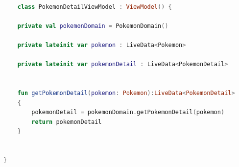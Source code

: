 \documentclass[a4paper, 12pt]{article}
\begin{document}
\begin{lstlisting}[caption={Pokemon Detail ViewModel.}, label={code:pk_detail_viewmodel}, language=Kotlin]

    class PokemonDetailViewModel : ViewModel() {

    private val pokemonDomain = PokemonDomain()

    private lateinit var pokemon : LiveData<Pokemon>

    private lateinit var pokemonDetail : LiveData<PokemonDetail>


    fun getPokemonDetail(pokemon: Pokemon):LiveData<PokemonDetail>
    {
        pokemonDetail = pokemonDomain.getPokemonDetail(pokemon)
        return pokemonDetail
    }


}
    

\end{lstlisting}  
\end{document}
